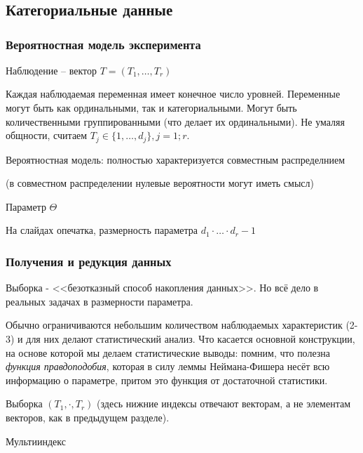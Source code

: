 \documentclass[main.tex]{subfiles}
\begin{document}
\section{  }
\subsection{Категориальные данные}
	
\subsubsection{Вероятностная модель эксперимента}

Наблюдение -- вектор $ T = (T_1, \dots, T_r) $

Каждая наблюдаемая переменная имеет конечное число уровней.
Переменные могут быть как ординальными, так и категориальными.
Могут быть количественными группированными (что делает их ординальными).
Не умаляя общности, считаем $ T_j \in \{ 1, \dots, d_j \}, j = 1;r $.

Вероятностная модель: полностью характеризуется совместным распределнием 

(в совместном распределении нулевые вероятности могут иметь смысл)


Параметр $ \Theta $

\begin{leftbar}
	На слайдах опечатка, размерность параметра $ d_1 \cdot \dots \cdot d_r - 1 $
\end{leftbar}

\subsubsection{Получения и редукция данных}

Выборка - <<безотказный способ накопления данных>>.
Но всё дело в реальных задачах в размерности параметра.

Обычно ограничиваются небольшим количеством наблюдаемых характеристик (2-3) и для них делают статистический анализ.
Что касается основной конструкции, на основе которой мы делаем статистические выводы: помним, что полезна \emph{функция правдоподобия}, которая в силу леммы Неймана-Фишера несёт всю информацию о параметре, притом это функция от достаточной статистики.

Выборка $ (T_1, \cdot, T_r) $ (здесь нижние индексы отвечают векторам, а не элементам векторов, как в предыдущем разделе).

Мультииндекс
\end{document}
